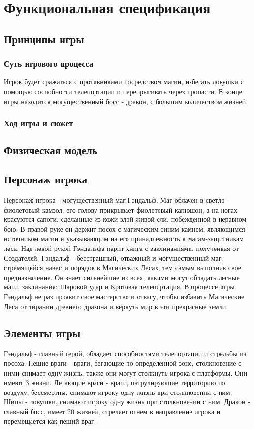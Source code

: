 \documentclass{article}
\begin{document}
\newpage
\section{Функциональная спецификация}
\subsection{Принципы игры}
\subsubsection{Суть игрового процесса}
Игрок будет сражаться с противниками посредством магии, избегать ловушки с помощью соспобности телепортации и перепрыгивать через пропасти. В конце игры находится могущественный босс - дракон, с большим количеством жизней.

\subsubsection{Ход игры и сюжет}

\subsection{Физическая модель}

\subsection{Персонаж игрока}
Персонаж игрока - могущественный маг Гэндальф. 
Маг облачен в светло-фиолетовый камзол, его голову прикрывает фиолетовый капюшон, а на ногах красуются сапоги, сделанные из кожи злой живой ели, побежденной в неравном бою. 
В правой руке он держит посох с магическим синим камнем, являющимся источником магии и указывающим на его принадлежность к магам-защитникам леса. 
Над левой рукой Гэндальфа парит книга с заклинаниями, полученная от Создателей. Гэндальф - бесстрашный, отважный  и могущественный маг, стремящийся навести порядок в Магических Лесах, тем самым выполнив свое предназначение. 
Он знает сильнейшие из всех, какими могут обладать лесные маги, заклинания: Шаровой удар и Кротовая телепортация.  
В процессе игры Гэндальф не раз проявит свое мастерство и отвагу, чтобы избавить Магические Леса от тирании древнего дракона и вернуть мир в эти прекрасные земли.  

\subsection{Элементы игры}
Гэндальф - главный герой, обладает способностями телепортации и стрельбы из посоха.
Пешие враги - враги, бегающие по определенной зоне, столкновение с ними снимает одну жизнь, также они могут столкнуть игрока с платформы. Они имеют 3 жизни.
Летающие враги - враги, патрулирующие территорию по воздуху, бессмертны, снимают игроку одну жизнь при столкновении с ним.
Шипы - ловушки, снимают игроку одну жизнь при столкновении с ним.
Дракон - главный босс, имеет 20 жизней, стреляет огнем в направление игрока и перемещается как пеший враг.
\end{document}
